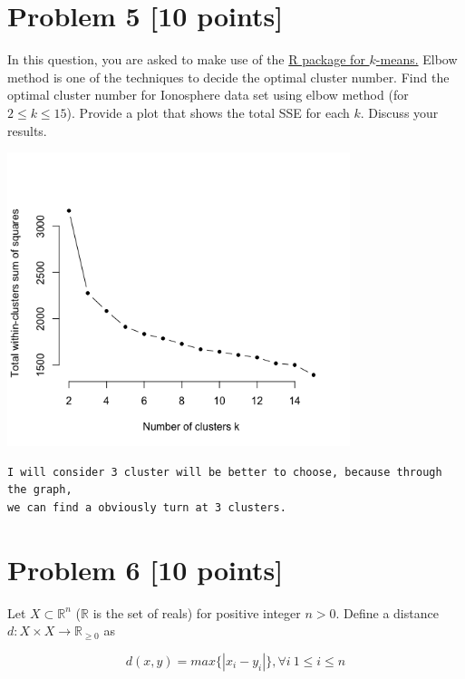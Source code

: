 \documentclass{article}
\begin{document}

 
 \section*{Problem 5 [10 points]} In this question, you are asked to make use of  the \href{https://stat.ethz.ch/R-manual/R-devel/library/stats/html/kmeans.html}{ R package for $k$-means.} Elbow method is one of the techniques to decide the optimal cluster number.  Find the optimal cluster number for Ionosphere data set using elbow method (for  $2 \leq k \leq 15$). Provide a plot that shows the total SSE for each $k$. Discuss your results.

\includegraphics[width=10cm]{5.png}
\begin{verbatim}
I will consider 3 cluster will be better to choose, because through the graph, 
we can find a obviously turn at 3 clusters.
\end{verbatim}

\pagebreak

 
\section*{Problem 6 [10 points]}

Let $X \subset \mathbb{R}^n$  ($\mathbb{R}$ is the set of reals) for positive integer  $n>0$. Define a  distance $d: X \times X \rightarrow  \mathbb{R}_{\geq 0} $ as

\begin{equation*}
d(x,y) =  max\{|x_i - y_i|\}, \forall i\ 1\leq i \leq n
\end{equation*}
\end{document}
